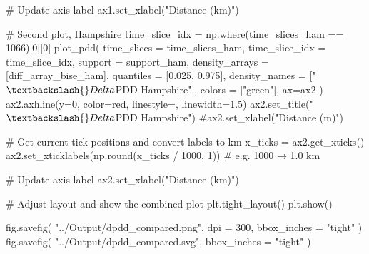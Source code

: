 \documentclass[
  11pt,
  letterpaper,
  DIV=11,
  numbers=noendperiod]{scrartcl}
\newenvironment{Shaded}{\begin{snugshade}}{\end{snugshade}}
\newcommand{\BuiltInTok}[1]{\textcolor[rgb]{0.00,0.23,0.31}{#1}}
\newcommand{\CommentTok}[1]{\textcolor[rgb]{0.37,0.37,0.37}{#1}}
\newcommand{\DecValTok}[1]{\textcolor[rgb]{0.68,0.00,0.00}{#1}}
\newcommand{\FloatTok}[1]{\textcolor[rgb]{0.68,0.00,0.00}{#1}}
\newcommand{\NormalTok}[1]{\textcolor[rgb]{0.00,0.23,0.31}{#1}}
\newcommand{\OperatorTok}[1]{\textcolor[rgb]{0.37,0.37,0.37}{#1}}
\newcommand{\StringTok}[1]{\textcolor[rgb]{0.13,0.47,0.30}{#1}}
\begin{document}
\begin{Shaded}
\begin{Highlighting}[]
\CommentTok{\# Update axis label}
\NormalTok{ax1.set\_xlabel(}\StringTok{"Distance (km)"}\NormalTok{)}

\CommentTok{\# Second plot, Hampshire}
\NormalTok{time\_slice\_idx }\OperatorTok{=}\NormalTok{ np.where(time\_slices\_ham }\OperatorTok{==} \DecValTok{1066}\NormalTok{)[}\DecValTok{0}\NormalTok{][}\DecValTok{0}\NormalTok{]}
\NormalTok{plot\_pdd(}
\NormalTok{    time\_slices }\OperatorTok{=}\NormalTok{ time\_slices\_ham,}
\NormalTok{    time\_slice\_idx }\OperatorTok{=}\NormalTok{ time\_slice\_idx,}
\NormalTok{    support }\OperatorTok{=}\NormalTok{ support\_ham,}
\NormalTok{    density\_arrays }\OperatorTok{=}\NormalTok{ [diff\_array\_bise\_ham],}
\NormalTok{    quantiles }\OperatorTok{=}\NormalTok{ [}\FloatTok{0.025}\NormalTok{, }\FloatTok{0.975}\NormalTok{],}
\NormalTok{    density\_names }\OperatorTok{=}\NormalTok{ [}\StringTok{"$\textbackslash{}Delta$PDD Hampshire"}\NormalTok{],}
\NormalTok{    colors }\OperatorTok{=}\NormalTok{ [}\StringTok{"green"}\NormalTok{],}
\NormalTok{    ax}\OperatorTok{=}\NormalTok{ax2}
\NormalTok{)}
\NormalTok{ax2.axhline(y}\OperatorTok{=}\DecValTok{0}\NormalTok{, color}\OperatorTok{=}\StringTok{\textquotesingle{}red\textquotesingle{}}\NormalTok{, linestyle}\OperatorTok{=}\StringTok{\textquotesingle{}{-}{-}\textquotesingle{}}\NormalTok{, linewidth}\OperatorTok{=}\FloatTok{1.5}\NormalTok{)}
\NormalTok{ax2.set\_title(}\StringTok{"$\textbackslash{}Delta$PDD Hampshire"}\NormalTok{)}
\CommentTok{\#ax2.set\_xlabel("Distance (m)")}

\CommentTok{\# Get current tick positions and convert labels to km}
\NormalTok{x\_ticks }\OperatorTok{=}\NormalTok{ ax2.get\_xticks()}
\NormalTok{ax2.set\_xticklabels(np.}\BuiltInTok{round}\NormalTok{(x\_ticks }\OperatorTok{/} \DecValTok{1000}\NormalTok{, }\DecValTok{1}\NormalTok{))  }\CommentTok{\# e.g. 1000 → 1.0 km}

\CommentTok{\# Update axis label}
\NormalTok{ax2.set\_xlabel(}\StringTok{"Distance (km)"}\NormalTok{)}

\CommentTok{\# Adjust layout and show the combined plot}
\NormalTok{plt.tight\_layout()}
\NormalTok{plt.show()}

\NormalTok{fig.savefig(}
    \StringTok{"../Output/dpdd\_compared.png"}\NormalTok{, }
\NormalTok{    dpi }\OperatorTok{=} \DecValTok{300}\NormalTok{, }
\NormalTok{    bbox\_inches }\OperatorTok{=} \StringTok{"tight"}
\NormalTok{)}
\NormalTok{fig.savefig(}
    \StringTok{"../Output/dpdd\_compared.svg"}\NormalTok{, }
\NormalTok{    bbox\_inches }\OperatorTok{=} \StringTok{"tight"}
\NormalTok{)}
\end{Highlighting}
\end{Shaded}
\end{document}
